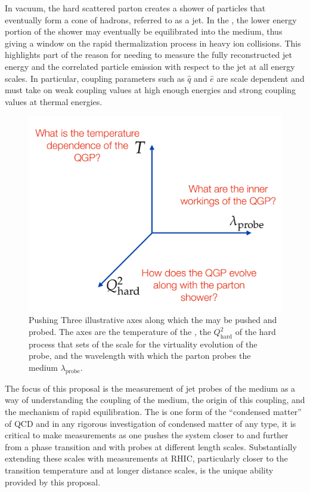 In vacuum, the hard scattered parton creates a shower of particles
that eventually form a cone of hadrons, referred to as a jet.  In the
\qgp, the lower energy portion of the shower may eventually be
equilibrated into the medium, thus giving a window on the rapid
thermalization process in heavy ion collisions.  This highlights part
of the reason for needing to measure the fully reconstructed jet
energy and the correlated particle emission with respect to the jet at
all energy scales.  In particular, coupling parameters such as
$\hat{q}$ and $\hat{e}$ are scale dependent and must take on weak
coupling values at high enough energies and strong
coupling values at thermal energies.

\begin{figure}[ht]
 \begin{center}
   \includegraphics[trim = 2 2 2 2, clip, width=\onewidth]{figs/figure_physicscase_threeaxes}
   \caption[ Pushing and probing the \qgp along three axes]{Pushing
     Three illustrative axes along which the \qgp may be pushed and
     probed.  The axes are the temperature of the \qgp, the
     $Q^2_{\mathrm{hard}}$ of the hard process that sets of the scale
     for the virtuality evolution of the probe, and the wavelength
     with which the parton probes the medium
     $\lambda_{\mathrm{probe}}$.}
   \label{fig:threeaxes}
 \end{center}
\end{figure}

The focus of this proposal is the measurement of jet probes of the
medium as a way of understanding the coupling of the medium, the
origin of this coupling, and the mechanism of rapid equilibration.
The \qgp is one form of the ``condensed matter''
of QCD and in any rigorous investigation of condensed matter of any
type, it is critical to make measurements as one pushes the system
closer to and further from a phase transition and with probes at
different length scales.  
Substantially extending these scales with measurements at RHIC, particularly closer 
to the transition temperature and at longer distance scales, is the unique ability provided by this proposal.

